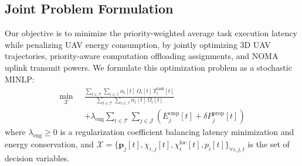 \documentclass[journal]{IEEEtran}
\begin{document}
\subsection{Joint Problem Formulation}

Our objective is to minimize the priority-weighted average task execution latency while penalizing UAV energy consumption, by jointly optimizing 3D UAV trajectories, priority-aware computation offloading assignments, and NOMA uplink transmit powers. We formulate this optimization problem as a stochastic MINLP:
\begin{equation}
\begin{aligned}
\min_{\mathcal{X}} \;\;
& \frac{\sum_{t \in \mathcal{T}} \sum_{i \in \mathcal{I}} \alpha_i[t] \, \Omega_i[t] \, T_i^{\mathrm{task}}[t]}{\sum_{t \in \mathcal{T}} \sum_{i \in \mathcal{I}} \alpha_i[t] \, \Omega_i[t]} \\
& + \lambda_{\mathrm{eng}} \sum_{t \in \mathcal{T}} \sum_{j \in \mathcal{J}} \left(E_j^{\mathrm{cmp}}[t] + \delta P_j^{\mathrm{prop}}[t]\right)
\end{aligned}
\label{eq:problem_obj}
\end{equation}
where $\lambda_{\mathrm{eng}} \ge 0$ is a regularization coefficient balancing latency minimization and energy conservation, and $\mathcal{X} = \{\mathbf{p}_j[t], \chi_{i,j}[t], \chi_i^{\mathrm{loc}}[t], p_i[t]\}_{\forall i, j, t}$ is the set of decision variables.
\end{document}
